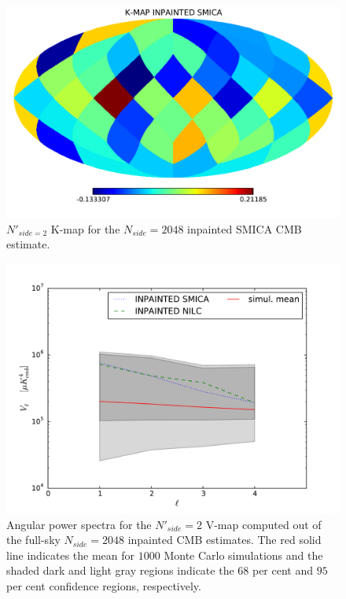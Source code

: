 \begin{figure}
\centering
\includegraphics[width=\textwidth]{figures/chapter-vsk/kmap-inpainted-smica.pdf}
\caption{$N'_{side = 2}$ K-map for the $N_{side} = 2048$ inpainted SMICA CMB estimate.}
\label{Fig:0c}
\end{figure}


\begin{figure}
\centering
\includegraphics[width=\textwidth]{figures/chapter-vsk/Inp_Vl.pdf}
\caption{Angular power spectra for the $N'_{side} = 2$ V-map computed out of the full-sky $N_{side} = 2048$ inpainted CMB estimates. The red solid line indicates the mean for $1000$ Monte Carlo simulations and the shaded dark and light gray regions indicate the $68$ per cent and $95$ per cent confidence regions, respectively.}
\label{Fig:1}
\end{figure}

